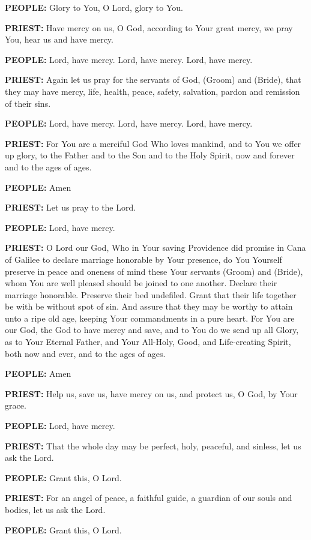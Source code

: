 \textbf{PEOPLE:} Glory to You, O Lord, glory to You.

\textbf{PRIEST:} Have mercy on us, O God, according to Your great mercy,
we pray You, hear us and have mercy.

\textbf{PEOPLE:} Lord, have mercy. Lord, have mercy. Lord, have mercy.

\textbf{PRIEST:} Again let us pray for the servants of God, (Groom) and
(Bride), that they may have mercy, life, health, peace, safety,
salvation, pardon and remission of their sins.

\textbf{PEOPLE:} Lord, have mercy. Lord, have mercy. Lord, have mercy.

\textbf{PRIEST:} For You are a merciful God Who loves mankind, and to
You we offer up glory, to the Father and to the Son and to the Holy
Spirit, now and forever and to the ages of ages.

\textbf{PEOPLE:} Amen

\textbf{PRIEST:} Let us pray to the Lord.

\textbf{PEOPLE:} Lord, have mercy.

\textbf{PRIEST:} O Lord our God, Who in Your saving Providence did
promise in Cana of Galilee to declare marriage honorable by Your
presence, do You Yourself preserve in peace and oneness of mind these
Your servants (Groom) and (Bride), whom You are well pleased should be
joined to one another. Declare their marriage honorable. Preserve their
bed undefiled. Grant that their life together be with be without spot of
sin. And assure that they may be worthy to attain unto a ripe old age,
keeping Your commandments in a pure heart. For You are our God, the God
to have mercy and save, and to You do we send up all Glory, as to Your
Eternal Father, and Your All-Holy, Good, and Life-creating Spirit, both
now and ever, and to the ages of ages.

\textbf{PEOPLE:} Amen

\textbf{PRIEST:} Help us, save us, have mercy on us, and protect us, O
God, by Your grace.

\textbf{PEOPLE:} Lord, have mercy.

\textbf{PRIEST:} That the whole day may be perfect, holy, peaceful, and
sinless, let us ask the Lord.

\textbf{PEOPLE:} Grant this, O Lord.

\textbf{PRIEST:} For an angel of peace, a faithful guide, a guardian of
our souls and bodies, let us ask the Lord.

\textbf{PEOPLE:} Grant this, O Lord.

